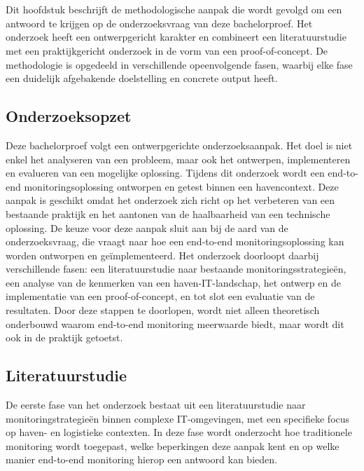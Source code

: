 \chapter{}
\label{ch:methodologie}

Dit hoofdstuk beschrijft de methodologische aanpak die wordt gevolgd om een antwoord te krijgen op de onderzoeksvraag van deze bachelorproef. Het onderzoek heeft een ontwerpgericht karakter en combineert een literatuurstudie met een praktijkgericht onderzoek in de vorm van een proof-of-concept. De methodologie is opgedeeld in verschillende opeenvolgende fasen, waarbij elke fase een duidelijk afgebakende doelstelling en concrete output heeft.

\section{Onderzoeksopzet}

Deze bachelorproef volgt een ontwerpgerichte onderzoeksaanpak. Het doel is niet enkel het analyseren van een probleem, maar ook het ontwerpen, implementeren en evalueren van een mogelijke oplossing. Tijdens dit onderzoek wordt een end-to-end monitoringsoplossing ontworpen en getest binnen een havencontext. Deze aanpak is geschikt omdat het onderzoek zich richt op het verbeteren van een bestaande praktijk en het aantonen van de haalbaarheid van een technische oplossing.
De keuze voor deze aanpak sluit aan bij de aard van de onderzoeksvraag, die vraagt naar hoe een end-to-end monitoringsoplossing kan worden ontworpen en geïmplementeerd. Het onderzoek doorloopt daarbij verschillende fasen: een literatuurstudie naar bestaande monitoringsstrategieën, een analyse van de kenmerken van een haven-IT-landschap, het ontwerp en de implementatie van een proof-of-concept, en tot slot een evaluatie van de resultaten. Door deze stappen te doorlopen, wordt niet alleen theoretisch onderbouwd waarom end-to-end monitoring meerwaarde biedt, maar wordt dit ook in de praktijk getoetst.

\section{Literatuurstudie}

De eerste fase van het onderzoek bestaat uit een literatuurstudie naar monitoringstrategieën binnen complexe IT-omgevingen, met een specifieke focus op haven- en logistieke contexten. In deze fase wordt onderzocht hoe traditionele monitoring wordt toegepast, welke beperkingen deze aanpak kent en op welke manier end-to-end monitoring hierop een antwoord kan bieden.

